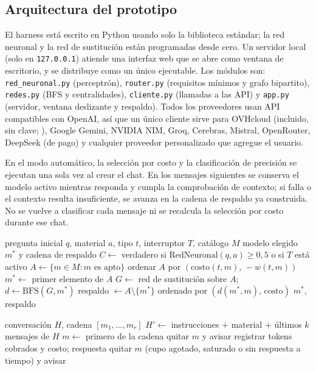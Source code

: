 \documentclass[12pt,letterpaper]{article}
\begin{document}
\subsection{Arquitectura del prototipo}
El harness está escrito en Python usando solo la biblioteca estándar; la red neuronal y la red de sustitución están programadas desde cero. Un servidor local (solo en \texttt{127.0.0.1}) atiende una interfaz web que se abre como ventana de escritorio, y se distribuye como un único ejecutable. Los módulos son: \texttt{red\_neuronal.py} (perceptrón), \texttt{router.py} (requisitos mínimos y grafo bipartito), \texttt{redes.py} (BFS y centralidades), \texttt{cliente.py} (llamadas a las API) y \texttt{app.py} (servidor, ventana deslizante y respaldo). Todos los proveedores usan API compatibles con OpenAI, así que un único cliente sirve para OVHcloud (incluido, sin clave; \cite{ovh2026}), Google Gemini, NVIDIA NIM, Groq, Cerebras, Mistral, OpenRouter, DeepSeek (de pago) y cualquier proveedor personalizado que agregue el usuario.

En el modo automático, la selección por costo y la clasificación de precisión se ejecutan una sola vez al crear el chat. En los mensajes siguientes se conserva el modelo activo mientras responda y cumpla la comprobación de contexto; si falla o el contexto resulta insuficiente, se avanza en la cadena de respaldo ya construida. No se vuelve a clasificar cada mensaje ni se recalcula la selección por costo durante ese chat.

\begin{algorithm}[htbp]
\caption{Elección del modelo al iniciar un chat}\label{alg:elegir}
\begin{algorithmic}[1]
\Require pregunta inicial $q$, material $a$, tipo $t$, interruptor $T$, catálogo $M$
\Ensure modelo elegido $m^{*}$ y cadena de respaldo
\State $C\gets$ verdadero si $\mathrm{RedNeuronal}(q,a)\ge 0{,}5$ o si $T$ está activo
\State $A\gets\{m\in M: m\text{ es apto}\}$ 
\State ordenar $A$ por $(\mathrm{costo}(t,m),\,-w(t,m))$ 
\State $m^{*}\gets$ primer elemento de $A$
\State $G\gets$ red de sustitución sobre $A$; \ $d\gets\mathrm{BFS}(G,m^{*})$
\State respaldo $\gets A\setminus\{m^{*}\}$ ordenado por $(d(m^{*},m),\,\mathrm{costo})$
\State \Return $m^{*}$, respaldo
\end{algorithmic}
\end{algorithm}

\begin{algorithm}[htbp]
\caption{Envío de un mensaje con respaldo}\label{alg:enviar}
\begin{algorithmic}[1]
\Require conversación $H$, cadena $[m_1,\dots,m_r]$
\State $H'\gets$ instrucciones $+$ material $+$ últimos $k$ mensajes de $H$ 
  \State $m\gets$ primero de la cadena
   quitar $m$ y avisar 
   registrar tokens cobrados y costo; \Return respuesta
  \Else{} quitar $m$ (cupo agotado, saturado o sin respuesta a tiempo) y avisar
  \EndIf
\EndWhile
\end{algorithmic}
\end{algorithm}
\end{document}
